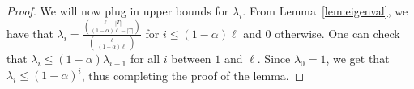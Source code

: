 \begin{proof}
We will now plug in upper bounds for $\lambda_i$. From Lemma~\ref{lem:eigenval}, we have that $\lambda_i = \frac{\binom{\ell - |T|}{(1 - \alpha)\ell - |T|}}{\binom{\ell}{(1 - \alpha)\ell}}$ for $i \leq (1-\alpha)\ell$ and $0$ otherwise. One can check that ${\lambda_i \leq (1-\alpha)\lambda_{i-1}}$ for all $i$ between $1$ and $\ell$. Since $\lambda_0 = 1$, we get that $\lambda_i \leq (1-\alpha)^i$, thus completing the proof of the lemma.

\end{proof}
